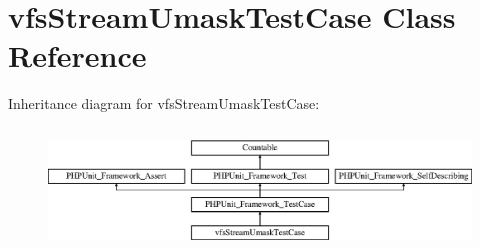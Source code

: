 \hypertarget{classorg_1_1bovigo_1_1vfs_1_1vfs_stream_umask_test_case}{}\section{vfs\+Stream\+Umask\+Test\+Case Class Reference}
\label{classorg_1_1bovigo_1_1vfs_1_1vfs_stream_umask_test_case}
Inheritance diagram for vfs\+Stream\+Umask\+Test\+Case\+:\begin{figure}[H]
\begin{center}
\leavevmode
\includegraphics[height=3.303835cm]{classorg_1_1bovigo_1_1vfs_1_1vfs_stream_umask_test_case}
\end{center}
\end{figure}
